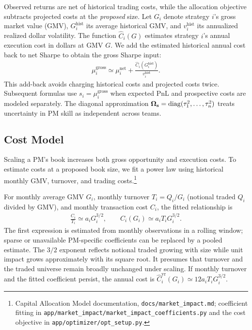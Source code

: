 \documentclass[11pt]{gappyarticle}
\begin{document}
Observed returns are net of historical trading costs, while the allocation
objective subtracts projected costs at the \emph{proposed} size.
Let $G_i$ denote strategy $i$'s gross market value (GMV),
$G_i^{\mathrm{hist}}$ its average historical GMV, and
$v_i^{\mathrm{hist}}$ its annualized realized dollar volatility.
The function $\widehat C_i(G)$ estimates strategy $i$'s annual execution
cost in dollars at GMV $G$. We add the estimated historical annual cost
back to net Sharpe to obtain the gross Sharpe input:
\begin{align}
    \mu_i^{\mathrm{gross}}
    \simeq \mu_i^{\mathrm{net}}
       +\frac{\widehat C_i(G_i^{\mathrm{hist}})}
                   {v_i^{\mathrm{hist}}}.
\end{align}
This add-back avoids
charging historical costs and projected costs twice. Subsequent formulas use
$s_i=\mu_i^{\mathrm{gross}}$ when expected PnL and prospective costs are
modeled separately. The diagonal approximation
${\boldsymbol{\Omega}}_{\mathbf{s}}=\operatorname{diag}(\tau_1^2,\ldots,\tau_n^2)$ treats
uncertainty in PM skill as independent across teams.
\subsection{Cost Model}
Scaling a PM's book increases both gross opportunity and execution costs.
To estimate costs at a proposed book size, we fit a power law using historical
monthly GMV, turnover, and trading costs.\footnote{Capital
Allocation Model documentation, \texttt{docs/market\_impact.md}; coefficient
fitting in \texttt{app/market\_impact/market\_impact\_coefficients.py} and
the cost objective in \texttt{app/optimizer/opt\_setup.py}.}

For monthly average GMV $G_i$, monthly turnover
$T_i=Q_i/G_i$ (notional traded $Q_i$ divided by GMV), and monthly
transaction cost $C_i$, the fitted relationship is
\begin{align}
    \frac{C_i}{T_i}\simeq a_iG_i^{3/2},
    \qquad C_i(G_i)\simeq a_i T_i G_i^{3/2}.
\end{align}
The first expression is estimated from monthly observations in a rolling
window; sparse or unavailable PM-specific coefficients can be replaced by a
pooled estimate. The $3/2$ exponent reflects notional traded growing with
size while unit impact grows approximately with its square root. It presumes
that turnover and the traded universe remain broadly unchanged under scaling.
If monthly turnover and the fitted coefficient persist, the annual cost is
$\widehat C_i^{\mathrm{yr}}(G_i)\simeq 12a_iT_iG_i^{3/2}$.
\end{document}
